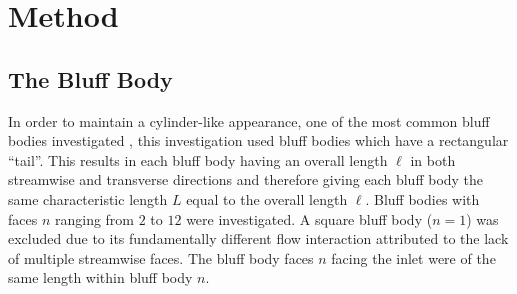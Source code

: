 \section{Method}
\subsection{The Bluff Body}
\label{sec:bluffBody}
In order to maintain a cylinder-like appearance, one of the most common bluff bodies investigated \parencite[475]{rocchi2002_vortex}, this investigation used bluff bodies which have a rectangular “tail”. This results in each bluff body having an overall length $\ell$ in both streamwise and transverse directions and therefore giving each bluff body the same characteristic length $L$ equal to the overall length $\ell$. Bluff bodies with faces $n$ ranging from $2$ to $12$ were investigated. A square bluff body ($n=1$) was excluded due to its fundamentally different flow interaction attributed to the lack of multiple streamwise faces. The bluff body faces $n$ facing the inlet were of the same length within bluff body $n$.
